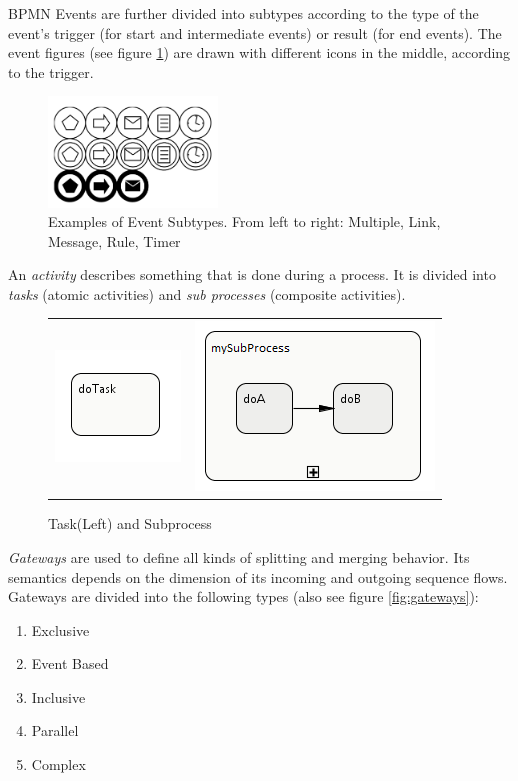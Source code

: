 BPMN Events are further divided into subtypes according to the type of the event's trigger (for start and intermediate events) or result (for end events). The event figures (see figure \ref{fig:event_subtypes}) are drawn with different icons in the middle, according to the trigger.
\begin{figure}[htbp]
	\centering
	\includegraphics[width=0.4\textwidth]{images/event_types.png}
	\caption{Examples of Event Subtypes. From left to right: Multiple, Link, Message, Rule, Timer}
	\label{fig:event_subtypes}
\end{figure}

 
An \textit{activity} describes something that is done during a process. It is divided into \textit{tasks} (atomic activities) and \textit{sub  processes} (composite activities).\\
\begin{figure}[h]
\centering
\begin{tabular}{cc}
\includegraphics{images/mapping/task.png} & \includegraphics{images/mapping/subprocess.png}
\end{tabular}
\caption{Task(Left) and Subprocess}%
\label{fig:task+subprocess}%
\end{figure}

\textit{Gateways} are used to define all kinds of splitting and merging behavior. Its semantics depends on the dimension of its incoming and outgoing sequence flows. Gateways are divided into the following types (also see figure \ref{fig:gateways}):\\
\begin{enumerate}
	\item Exclusive
	\item Event Based
	\item Inclusive
	\item Parallel
	\item Complex
\end{enumerate}



